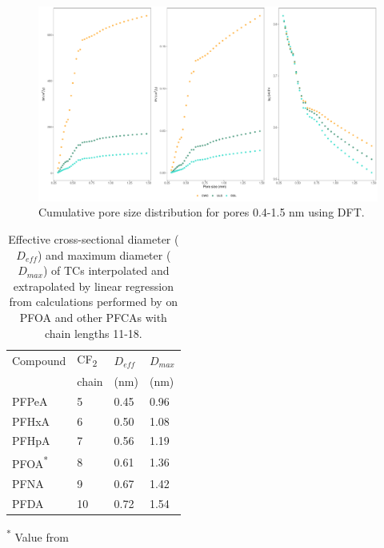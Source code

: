 
\begin{figure}[htb]
    \centering
    \includegraphics[width=\textwidth]{R/figs/PZD_SAPV_C_small_plot.pdf}
    \caption{Cumulative pore size distribution for pores 0.4-1.5 nm using DFT.}
    \label{fig:PZD_small}
\end{figure}

\begin{table}
\caption{Effective cross-sectional diameter ($D_{eff}$) and maximum diameter ($D_{max}$) of TCs interpolated and extrapolated by linear regression from calculations performed by \cite{inoue2012size} on PFOA and other PFCAs with chain lengths 11-18.}
\centering
\begin{threeparttable}
\label{tab:molecsize}
\begin{tabular}{llll}
\toprule
Compound & CF\textsubscript{2} & $D_{eff}$ & $D_{max}$ \\ 
& chain & (nm) & (nm) \\ \midrule
PFPeA & 5  & 0.45  & 0.96  \\
PFHxA & 6  & 0.50  & 1.08  \\
PFHpA & 7  & 0.56  & 1.19  \\
PFOA\textsuperscript{*} & 8 & 0.61 & 1.36 \\
PFNA & 9 & 0.67 & 1.42  \\
PFDA & 10 & 0.72 & 1.54  \\ \bottomrule                                    
\end{tabular}
\begin{tablenotes}
\item \textsuperscript{*} Value from \cite{inoue2012size}
\end{tablenotes}
\end{threeparttable}
\end{table}

